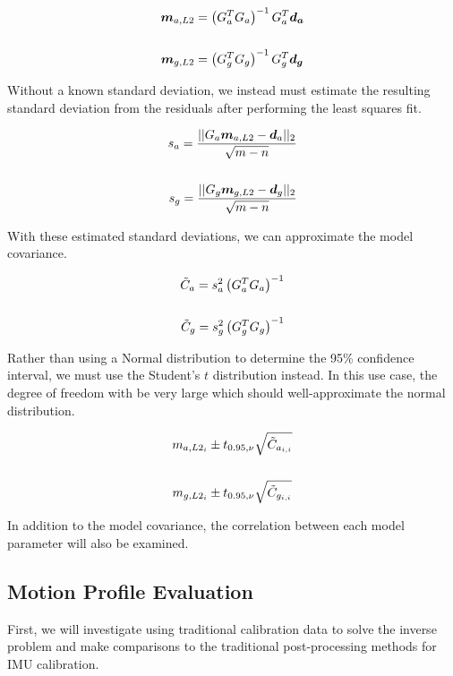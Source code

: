 \begin{align} \label{eq: L2 Regression}
	\boldsymbol{m}_{a,L2} &= \left(G_a^T G_a\right)^{-1} G_a^T \boldsymbol{d_a} \notag\\
	\\
	\boldsymbol{m}_{g,L2} &= \left(G_g^T G_g\right)^{-1} G_g^T \boldsymbol{d_g} \notag
\end{align}

Without a known standard deviation, we instead must estimate the resulting standard deviation from the residuals after performing the least squares fit. 

\begin{align} \label{eq: estimated sigma}
	s_a = \frac{|| {G_a \boldsymbol{m}_{a,L2} - \boldsymbol{d}_a} ||_2}{\sqrt{m - n}} \notag\\
	\\
	s_g = \frac{|| {G_g \boldsymbol{m}_{g,L2} - \boldsymbol{d}_g} ||_2}{\sqrt{m - n}} \notag
\end{align}

With these estimated standard deviations, we can approximate the model covariance. 

\begin{align} \label{eq: estimated model covaraince}
	\tilde{C}_a = s_a^2 \left(G_a^T G_a\right)^{-1} \notag\\
	\\
	\tilde{C}_g = s_g^2 \left(G_g^T G_g\right)^{-1} \notag
\end{align}

Rather than using a Normal distribution to determine the 95\% confidence interval, we must use the Student's $t$ distribution instead. In this use case, the degree of freedom with be very large which should well-approximate the normal distribution. 

\begin{align} \label{eq: confidence intervals}
	m_{a,L2_i} &\pm t_{0.95,\nu} \sqrt{\tilde{C}_{a_{i,i}}}  \notag\\
	\\
	m_{g,L2_i} &\pm t_{0.95,\nu} \sqrt{\tilde{C}_{g_{i,i}}}  \notag
\end{align}

In addition to the model covariance, the correlation between each model parameter will also be examined. 


\subsection{Motion Profile Evaluation}

First, we will investigate using traditional calibration data to solve the inverse problem and make comparisons to the traditional post-processing methods for IMU calibration. 

